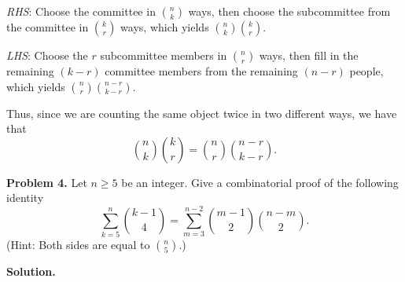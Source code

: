 \emph{RHS}: Choose the committee in $ \binom{n}{k} $ ways,
then choose the subcommittee from the committee in $ \binom{k}{r} $ ways,
which yields $ \binom{n}{k}\binom{k}{r} $.

\emph{LHS}: Choose the $ r $ subcommittee members in $ \binom{n}{r} $ ways,
then fill in the remaining $ (k-r) $ committee members from the
remaining $ (n-r) $ people, which yields $ \binom{n}{r}\binom{n-r}{k-r} $.

Thus, since we are counting the same object twice in two different ways,
we have that
\[ \binom{n}{k}\binom{k}{r}=\binom{n}{r}\binom{n-r}{k-r}. \]

\textbf{Problem 4.} Let $ n\geqslant 5 $ be an integer. Give a combinatorial
proof of the following identity
\[ \sum\limits_{k=5}^{n} \binom{k-1}{4} = \sum\limits_{m=3}^{n-2} \binom{m-1}{2}
\binom{n-m}{2}. \]
(Hint: Both sides are equal to $ \binom{n}{5} $.)

\textbf{Solution.}
